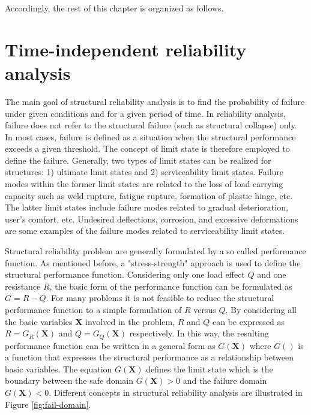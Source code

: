 Accordingly, the rest of this chapter is organized as follows. 

\section{Time-independent reliability analysis}
\noindent
The main goal of structural reliability analysis is to find the probability of failure under given conditions and for a given period of time. In reliability analysis, failure does
not refer to the structural failure (such as structural collapse) only. In most cases, failure is defined as a situation when the structural performance exceeds a given threshold. 
The concept of limit state is therefore employed to define the failure. Generally, two types of limit states can be realized for structures: 1) ultimate limit states and 2) 
serviceability limit states. Failure modes within the former limit states are related to the loss of load carrying capacity such as weld rupture, fatigue rupture, formation of
plastic hinge, etc. The latter limit states include failure modes related to gradual deterioration, user's comfort, etc. Undesired deflections, corrosion, and excessive deformations
are some examples of the failure modes related to serviceability limit states. 

Structural reliability problem are generally formulated by a so called performance function. As mentioned before, a "stress-strength" approach is used to define the structural 
performance function. Considering only one load effect $Q$ and one resistance $R$, the basic form of the performance function can be formulated as $G=R-Q$. For many problems it 
is not feasible to reduce the structural performance function to a simple formulation of $R$ versus $Q$. By considering all the basic variables $\textbf{X}$ involved in the problem,
$R$ and $Q$ can be expressed as $R=G_R(\textbf{X})$ and $Q=G_Q(\textbf{X})$ respectively. In this way, the resulting performance function can be written in a general form as
$G(\textbf{X})$ where $G()$ is a function that expresses the structural performance as a relationship between basic variables. The equation $G(\textbf{X})$ defines the limit state 
which is the boundary between the safe domain $G(\textbf{X})>0$ and the failure domain $G(\textbf{X})<0$. Different concepts in structural reliability analysis are illustrated in 
Figure \ref{fig:fail-domain}.

